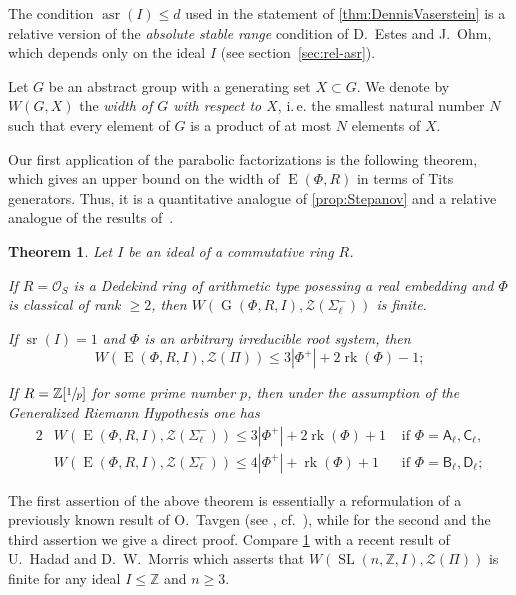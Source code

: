 \documentclass[oneside, 12pt]{amsart}
\theoremstyle{plain}
\newtheorem{thm}{Theorem}
\numberwithin{equation}{section}
\numberwithin{lemma}{section}
\theoremstyle{definition}
\theoremstyle{remark}
\DeclareMathOperator{\G}{G}
\DeclareMathOperator{\SL}{SL}
\DeclareMathOperator{\E}{E}
\DeclareMathOperator{\sr}{sr}
\DeclareMathOperator{\asr}{asr}
\DeclareMathOperator{\rk}{rk}
\newcommand{\rA}{\mathsf{A}}
\newcommand{\rB}{\mathsf{B}}
\newcommand{\rC}{\mathsf{C}}
\newcommand{\rD}{\mathsf{D}}
\begin{document}
The condition $\asr(I) \leq d$ used in the statement of \cref{thm:DennisVaserstein} is a relative version of the \emph{absolute stable range} condition of D.~Estes and J.~Ohm, which depends only on the ideal $I$ (see section~\ref{sec:rel-asr}).

Let $G$ be an abstract group with a generating set $X \subset G$. 
We denote by $W(G, X)$ the \emph{width of $G$ with respect to $X$}, i.\,e. the smallest natural number $N$ such that every element of $G$ is a product of at most $N$ elements of $X$.

Our first application of the parabolic factorizations is the following theorem, which gives an upper bound on the width of $\E(\Phi, R)$ in terms of Tits generators. 
Thus, it is a quantitative analogue of \cref{prop:Stepanov}
and a relative analogue of the results of~\cite{Tavgen91, VseUnitrZ1p, VavSmSuUnitrEng}.
\begin{thm}\label{thm:width} Let $I$ be an ideal of a commutative ring $R$.
\begin{thmlist}
\item If $R=\mathcal{O}_S$ is a Dedekind ring of arithmetic type posessing a real embedding and $\Phi$ is classical of rank $\geqslant2$, then 
$W(\G(\Phi, R, I), \mathcal{Z}(\Sigma_\ell^-))$ is finite.
\item If $\sr(I) = 1$ and $\Phi$ is an arbitrary irreducible root system, then 
\[W(\E(\Phi, R, I), \mathcal{Z}(\Pi))\leqslant 3|\Phi^+|+2\rk(\Phi)-1;\]
\item If $R = \mathbb{Z}[\sfrac{1}{p}]$ for some prime number $p$, then under the assumption of the Generalized Riemann Hypothesis one has
\begin{alignat*}{2}
& W(\E(\Phi, R, I), \mathcal{Z}(\Sigma_\ell^-))\leqslant 3|\Phi^+| + 2\rk(\Phi) + 1 & \text{ if } \Phi=\rA_\ell, \rC_\ell, \\
& W(\E(\Phi, R, I), \mathcal{Z}(\Sigma_\ell^-))\leqslant 4|\Phi^+| + \rk(\Phi) + 1 & \text{ if } \Phi=\rB_\ell, \rD_\ell;
\end{alignat*}
\end{thmlist}
\end{thm}
The first assertion of the above theorem is essentially a reformulation of a previously known result of O.~Tavgen (see \cite{TavgenThesis}, cf.~\cite{Mo07}), 
while for the second and the third assertion we give a direct proof.
Compare \cref{thm:width} with a recent result of U.~Hadad and D.~W.~Morris \cite[Theorem~1.6]{Ha12} which asserts that 
$W(\SL(n, \mathbb{Z}, I), \mathcal{Z}(\Pi))$ is finite for any ideal $I \leq \mathbb{Z}$ and $n \geq 3$.
\end{document}

